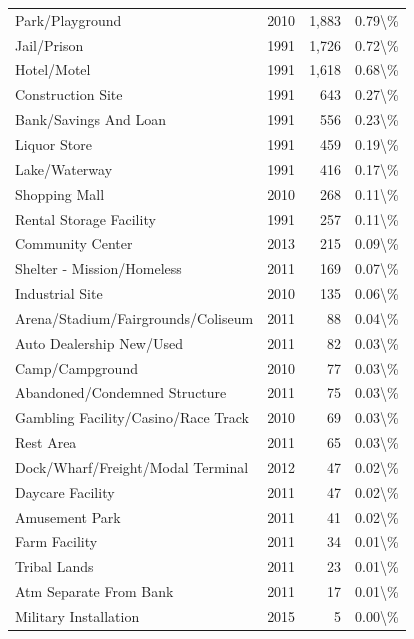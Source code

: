\documentclass[
  12pt,
  openany]{book}
\begin{document}
\begin{longtable}[t]{lrrl}
Park/Playground & 2010 & 1,883 & 0.79\textbackslash{}\%\\
Jail/Prison & 1991 & 1,726 & 0.72\textbackslash{}\%\\
Hotel/Motel & 1991 & 1,618 & 0.68\textbackslash{}\%\\
Construction Site & 1991 & 643 & 0.27\textbackslash{}\%\\
\addlinespace
Bank/Savings And Loan & 1991 & 556 & 0.23\textbackslash{}\%\\
Liquor Store & 1991 & 459 & 0.19\textbackslash{}\%\\
Lake/Waterway & 1991 & 416 & 0.17\textbackslash{}\%\\
Shopping Mall & 2010 & 268 & 0.11\textbackslash{}\%\\
Rental Storage Facility & 1991 & 257 & 0.11\textbackslash{}\%\\
\addlinespace
Community Center & 2013 & 215 & 0.09\textbackslash{}\%\\
Shelter - Mission/Homeless & 2011 & 169 & 0.07\textbackslash{}\%\\
Industrial Site & 2010 & 135 & 0.06\textbackslash{}\%\\
Arena/Stadium/Fairgrounds/Coliseum & 2011 & 88 & 0.04\textbackslash{}\%\\
Auto Dealership New/Used & 2011 & 82 & 0.03\textbackslash{}\%\\
\addlinespace
Camp/Campground & 2010 & 77 & 0.03\textbackslash{}\%\\
Abandoned/Condemned Structure & 2011 & 75 & 0.03\textbackslash{}\%\\
Gambling Facility/Casino/Race Track & 2010 & 69 & 0.03\textbackslash{}\%\\
Rest Area & 2011 & 65 & 0.03\textbackslash{}\%\\
Dock/Wharf/Freight/Modal Terminal & 2012 & 47 & 0.02\textbackslash{}\%\\
\addlinespace
Daycare Facility & 2011 & 47 & 0.02\textbackslash{}\%\\
Amusement Park & 2011 & 41 & 0.02\textbackslash{}\%\\
Farm Facility & 2011 & 34 & 0.01\textbackslash{}\%\\
Tribal Lands & 2011 & 23 & 0.01\textbackslash{}\%\\
Atm Separate From Bank & 2011 & 17 & 0.01\textbackslash{}\%\\
\addlinespace
Military Installation & 2015 & 5 & 0.00\textbackslash{}\%\\
\bottomrule
\end{longtable}
\end{document}
